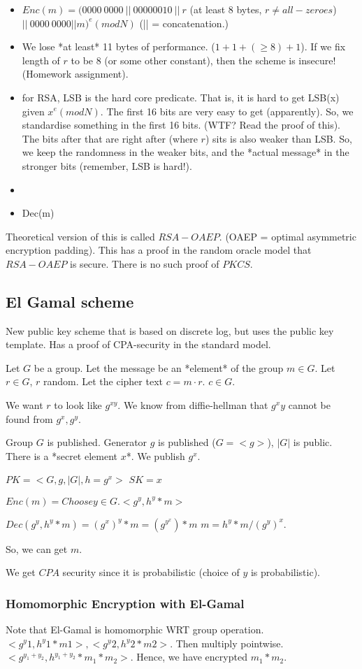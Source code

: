 \begin{itemize}
\item $Enc(m) = (0000~0000~||~0000 0010~||~r$ (at least 8 bytes, $r \neq all-zeroes$) $||~0000~0000 || m)^e (mod N)$ (|| = concatenation.)
\item We lose *at least* 11 bytes of performance. ($1 + 1 + (\geq 8) + 1$). If we fix length of $r$ to be $8$ (or some other constant),
  then the scheme is insecure! (Homework assignment).
\item for RSA, LSB is the hard core predicate. That is, it is hard to get LSB(x) given $x^e (mod N)$. The first 16 bits are very easy to get (apparently).
  So, we standardise something in the first 16 bits. (WTF? Read the proof of this). The bits after that are right after (where $r$) sits is
  also weaker than LSB. So, we keep the randomness in the weaker bits, and the *actual message* in the stronger bits (remember, LSB is hard!).
\item 
\item Dec(m)
\end{itemize}

Theoretical version of this is called $RSA-OAEP$. (OAEP = optimal asymmetric encryption padding).
This has a proof in the random oracle model that $RSA-OAEP$ is secure. There is no such proof of $PKCS$.

\subsection{El Gamal scheme}
New public key scheme that is based on discrete log, but uses the public key template.
Has a proof of CPA-security in the standard model.


Let $G$ be a group. Let the message be an *element* of the group $m \in G$.
Let $r \in G$, $r$ random. Let the cipher text $c = m \cdot r$. $c \in G$.

We want $r$ to look like $g^{xy}$. We know from diffie-hellman that $g^xy$ cannot be found from
$g^x, g^y$.

Group $G$ is published. Generator $g$ is published ($G = <g>$), $|G|$ is public.
There is a *secret element $x$*. We publish $g^x$.

$PK = <G, g, |G|, h = g^x>$
$SK = x$

$Enc(m) = Choose y \in G. <g^y, h^y * m>$

$Dec(g^y, h^y * m) = (g^x)^y * m = (g^{y^x}) * m$
$m = h^y * m / (g^y)^x.$

So, we can get $m$.

We get $CPA$ security since it is probabilistic (choice of $y$ is probabilistic).


\subsubsection{Homomorphic Encryption with El-Gamal}
Note that El-Gamal is homomorphic WRT group operation.
$<g^y1, h^y1 * m1>, <g^y2, h^y2 * m2>$. Then multiply pointwise. $<g^{y_1 + y_2}, h^{y_1 + y_2}*m_1*m_2>$. Hence, we have encrypted $m_1 * m_2$.




